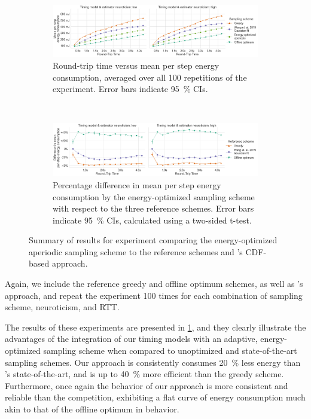 \begin{figure}
    \centering
    \begin{subfigure}[t]{\textwidth}
        \centering
        \includegraphics[width=\textwidth]{figs/new_model/energy_optimization.png}
        \caption{%
            Round-trip time versus mean per step energy consumption, averaged over all \num{100} repetitions of the experiment.
            Error bars indicate \SI{95}{\percent} \acp{CI}.
        }
    \end{subfigure}\\
    \medskip
    \begin{subfigure}[t]{\textwidth}
        \centering
        \includegraphics[width=\textwidth]{figs/new_model/energy_optimization_diff.png}
        \caption{%
            Percentage difference in mean per step energy consumption by the energy-optimized sampling scheme with respect to the three reference schemes.
            Error bars indicate \SI{95}{\percent} \acp{CI}, calculated using a two-sided t-test.
        }
    \end{subfigure}
    \caption{%
        Summary of results for experiment comparing the energy-optimized aperiodic sampling scheme to the reference schemes and \textcite{Wang2019Towards}'s \ac{CDF}-based approach.
    }\label{fig:optimization:energy}
\end{figure}

Again, we include the reference greedy and offline optimum schemes, as well as \textcite{Wang2019Towards}'s approach, and repeat the experiment \num{100} times for each combination of sampling scheme, neuroticism, and \ac{RTT}.

The results of these experiments are presented in \cref{fig:optimization:energy}, and they clearly illustrate the advantages of the integration of our timing models with an adaptive, energy-optimized sampling scheme when compared to unoptimized and state-of-the-art sampling schemes.
Our approach is consistently consumes \SI{20}{\percent} less energy than \textcite{Wang2019Towards}'s state-of-the-art, and is up to \SI{40}{\percent} more efficient than the greedy scheme.
Furthermore, once again the behavior of our approach is more consistent and reliable than the competition, exhibiting a flat curve of energy consumption much akin to that of the offline optimum in behavior.